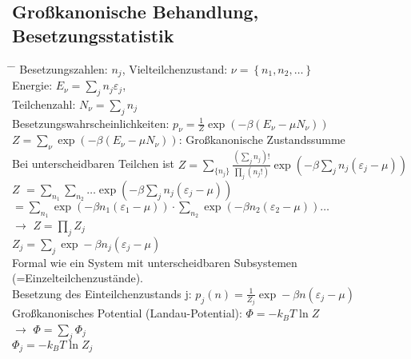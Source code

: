 \subsection{Großkanonische Behandlung, Besetzungsstatistik}
\begin{tabbing}
\hspace{4em} \= \hspace{4em} \= \kill
Besetzungszahlen: $n_j$, Vielteilchenzustand: $\nu = \left\{ n_1,n_2, \dots\right\}$\\
\> Energie: $E_{\nu} = \sum\limits_{j} n_j \varepsilon_j$,\\
\> Teilchenzahl: $N_{\nu} = \sum\limits_{j} n_{j}$\\
\> Besetzungswahrscheinlichkeiten: $p_{\nu} = \frac{1}{Z} \exp \left(-\beta\left(E_{\nu}- \mu N_{\nu}\right)\right)$\\
\> $Z = \sum\limits_{\nu} \exp \left(-\beta\left(E_{\nu} - \mu N_{\nu}\right)\right)$: Großkanonische Zustandssumme\\
Bei unterscheidbaren Teilchen ist $Z = \sum\limits_{\{n_j\}}\frac{\left(\sum_j n_j\right)!}{\prod_j\left(n_j!\right)}\exp\left(-\beta\sum_j n_j \left(\varepsilon_j - \mu\right)\right)$\\
$Z$\> $= \sum\limits_{n_1}\sum\limits_{n_2}\dots \exp \left(-\beta \sum_{j} n_{j} \left(\varepsilon_j - \mu\right)\right) $\\
\>$=\sum\limits_{n_1} \exp \left(-\beta n_1 \left(\varepsilon_1 - \mu\right)\right) \cdot \sum\limits_{n_2} \exp \left(-\beta n_2 \left(\varepsilon_2 - \mu\right)\right) \dots $\\
$\rightarrow$ \> $Z = \prod\limits_j Z_j$\\
\> $Z_j = \sum\limits_j \exp - \beta n_j \left(\varepsilon_j - \mu\right)$\\
Formal wie ein System mit unterscheidbaren Subsystemen (=Einzelteilchenzustände).\\
\>Besetzung des Einteilchenzustands j: $p_j(n) = \frac{1}{Z_j} \exp - \beta n \left(\varepsilon_j - \mu\right)$\\
\>Großkanonisches Potential (Landau-Potential): $\Phi = -k_B T \ln Z$\\
$\rightarrow$\> $\Phi = \sum\limits_j \Phi_j$\\
\> $\Phi_j = -k_B T \ln Z_j$\\



\end{tabbing}
